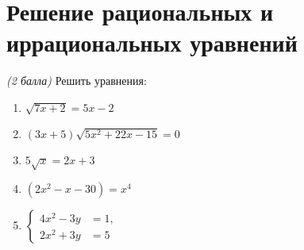 \documentclass[12pt, a5paper]{article}
\begin{document}
		

\section*{Решение рациональных и иррациональных уравнений}
\textit{(2 балла)} Решить уравнения:
\begin{multicols}{2}
	\begin{enumerate}
		\item $\sqrt{7x+2}=5x-2$
		\item $(3x+5)\sqrt{5x^2+22x-15}=0$
		\item $5\sqrt{x}=2x+3$
		\item $(2x^2-x-30)=x^4$
		\item $\left\{
		\begin{aligned}
			4x^2-3y&=1,\\
			2x^2+3y&=5
		\end{aligned}
		\right.$
		
	\end{enumerate}
\end{multicols}
\end{document}
